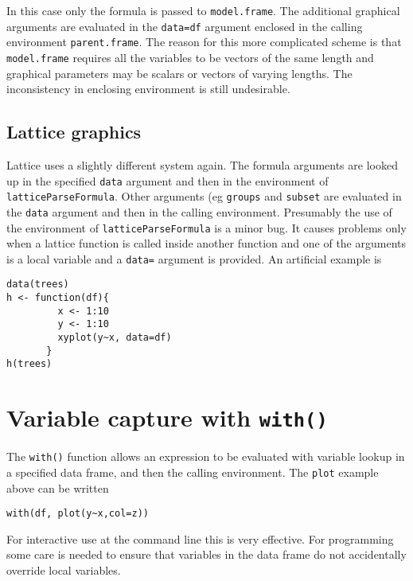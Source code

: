 \documentclass[11pt]{article}
\begin{document}
In this case only the formula is passed to \texttt{model.frame}.  The additional graphical arguments are evaluated in the  \texttt{data=df} argument enclosed in the calling environment \texttt{parent.frame}.  The reason for this more complicated scheme is that \texttt{model.frame} requires all the variables to be vectors of the same length and graphical parameters may be scalars or vectors of varying lengths. The inconsistency in enclosing environment is still undesirable.


\subsection{Lattice graphics}
Lattice uses a slightly different system again.  The formula arguments are looked up in the specified \texttt{data} argument and then in the environment of \texttt{latticeParseFormula}. Other arguments (eg \texttt{groups} and \texttt{subset} are evaluated in the \texttt{data} argument and then in the calling environment.    Presumably the use of the environment of \texttt{latticeParseFormula} is a minor bug. It causes problems only when a lattice function is called inside another function and one of the arguments is a local variable and a \texttt{data=} argument is provided.  An artificial example is
\begin{verbatim}
data(trees)
h <- function(df){
         x <- 1:10
         y <- 1:10
         xyplot(y~x, data=df)
       }
h(trees)
\end{verbatim}





\section{Variable capture with \texttt{with()}}
The \verb=with()= function allows an expression to be evaluated with variable lookup in a specified data frame,  and then the calling environment. The \texttt{plot} example above can be written
\begin{verbatim}
with(df, plot(y~x,col=z))
\end{verbatim}
For interactive use at the command line this is very effective.  For programming some care is needed to ensure that variables in the data frame do not accidentally override local variables.
\end{document}
